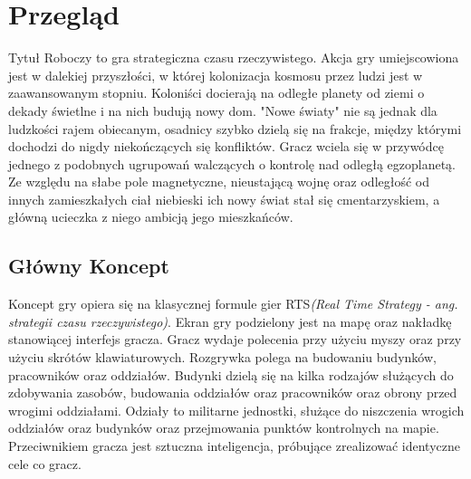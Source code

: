 \documentclass[a4paper]{scrreprt}
\title{\GameTiTle{}}
\subtitle{}
\author{Laura Stasiulewicz}
\def \GameTiTle{Tytuł Roboczy}
\begin{document}
\maketitle

\begin{abstract}
\GameTiTle{} to gra strategiczna czasu rzeczywistego. Celem gracza jest pokonanie komputerowego przeciwnika w walce o kontrolę nad punktem dominacji na mapie. Aby to uczynić musi wykorzystać zdolność planowania, zarządzania zarówno jednostkami jak i zasobami oraz wiedzy na temat dostępnych rodzajów oddziałów jakie może przywołać i interakcji między nimi.  %

\end{abstract}

\tableofcontents

\chapter{Przegląd}
\GameTiTle{} to gra strategiczna czasu rzeczywistego. Akcja gry umiejscowiona jest w dalekiej przyszłości, w której kolonizacja kosmosu przez ludzi jest w zaawansowanym stopniu. Koloniści docierają na odległe planety od ziemi o dekady świetlne i na nich budują nowy dom. "Nowe światy" nie są jednak dla ludzkości rajem obiecanym, osadnicy szybko dzielą się na frakcje, między którymi dochodzi do nigdy niekończących się konfliktów. Gracz wciela się w przywódcę jednego z podobnych ugrupowań walczących o kontrolę nad odległą egzoplanetą. Ze względu na słabe pole magnetyczne, nieustającą wojnę oraz odległość od innych zamieszkałych ciał niebieski ich nowy świat stał się cmentarzyskiem, a główną ucieczka z niego ambicją jego mieszkańców.
\section{Główny Koncept}
Koncept gry opiera się na klasycznej formule gier RTS\emph{(Real Time Strategy - ang. strategii czasu rzeczywistego)}. Ekran gry podzielony jest na mapę oraz nakładkę stanowiącej interfejs gracza. Gracz wydaje polecenia przy użyciu myszy oraz przy użyciu skrótów klawiaturowych. Rozgrywka polega na budowaniu budynków, pracowników oraz oddziałów. Budynki dzielą się na kilka rodzajów służących do zdobywania zasobów, budowania oddziałów oraz pracowników oraz obrony przed wrogimi oddziałami. Odziały to militarne jednostki, służące do niszczenia wrogich oddziałów oraz budynków oraz przejmowania punktów kontrolnych na mapie. Przeciwnikiem gracza jest sztuczna inteligencja, próbujące zrealizować identyczne cele co gracz.
\end{document}
